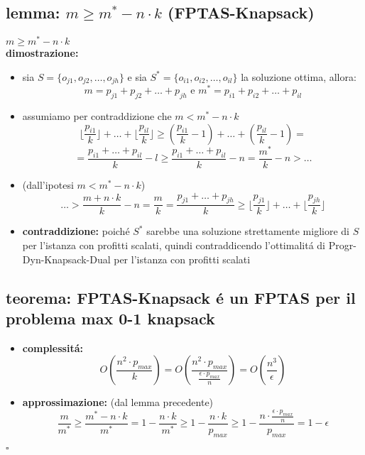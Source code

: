 \subsection*{lemma: $m\geq m^*-n\cdot k$ (FPTAS-Knapsack)}
\begin{flushleft}
	$m\geq m^*-n\cdot k$ \newline \\
	\textbf{dimostrazione:}
	\begin{itemize}
		\item sia $S=\{o_{j1},o_{j2},\ldots,o_{jh}\}$ e sia $S^*=\{o_{i1},o_{i2},\ldots,o_{il}\}$ la soluzione ottima, allora:
			$$m=p_{j1}+p_{j2}+\ldots+p_{jh}\text{ e }m^*=p_{i1}+p_{i2}+\ldots+p_{il}$$
		\item assumiamo per contraddizione che $m<m^*-n\cdot k$
			$$\lfloor\frac{p_{i1}}{k}\rfloor+\ldots+\lfloor\frac{p_{il}}{k}\rfloor\geq(\frac{p_{i1}}{k}-1)+\ldots+(\frac{p_{il}}{k}-1)=$$
			$$=\frac{p_{i1}+\ldots+p_{il}}{k}-l\geq\frac{p_{i1}+\ldots+p_{il}}{k}-n=\frac{m^*}{k}-n>\ldots$$
		\item (dall'ipotesi $m<m^*-n\cdot k$)
			$$\ldots>\frac{m+n\cdot
			k}{k}-n=\frac{m}{k}=\frac{p_{j1}+\ldots+p_{jh}}{k}\geq\lfloor\frac{p_{j1}}{k}\rfloor+\ldots+\lfloor\frac{p_{jh}}{k}\rfloor$$
		\item \textbf{contraddizione:} poich\'e $S^*$ sarebbe una soluzione strettamente migliore di $S$ per l'istanza con profitti scalati, quindi contraddicendo l'ottimalit\'a di Progr-Dyn-Knapsack-Dual per l'istanza con profitti scalati
	\end{itemize}
\end{flushleft}


\subsection*{teorema: FPTAS-Knapsack \'e un FPTAS per il problema max 0-1 knapsack}
\begin{flushleft}
	\begin{itemize}
		\item \textbf{complessit\'a:}
			$$O(\frac{n^2\cdot p_{max}}{k})=O(\frac{n^2\cdot p_{max}}{\frac{\epsilon\cdot
			p_{max}}{n}})=O(\frac{n^3}{\epsilon})$$
		\item \textbf{approssimazione:} (dal lemma precedente)
			$$\frac{m}{m^*}\geq\frac{m^*-n\cdot k}{m^*}=1-\frac{n\cdot k}{m^*}\geq1-\frac{n\cdot k}{p_{max}}\geq 1-\frac{n\cdot\frac{\epsilon\cdot p_{max}}{n}}{p_{max}}=1-\epsilon$$
	\end{itemize}
	\hfill$\square$
\end{flushleft}

